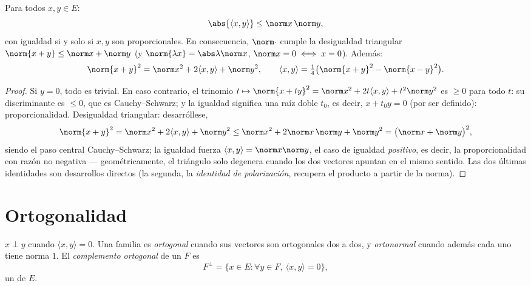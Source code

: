 \begin{theorem}\label{thm:b1:euclid:cs}
Para todos $x, y \in E$:
\[
\abs{\langle x, y\rangle} \leq \norm x\, \norm y ,
\]
con igualdad si y solo si $x, y$ son proporcionales. En consecuencia,
$\norm\cdot$ cumple la desigualdad triangular
$\norm{x + y} \leq \norm x + \norm y$ (y
$\norm{\lambda x} = \abs\lambda \norm x$, $\norm x = 0 \iff x = 0$).
Además:
\[
\norm{x+y}^2 = \norm x^2 + 2\langle x, y\rangle + \norm y^2,
\qquad
\langle x, y \rangle = \tfrac14\bigl(\norm{x+y}^2 -
\norm{x-y}^2\bigr) .
\]
\end{theorem}

\begin{proof}
Si $y = 0$, todo es trivial. En caso contrario, el trinomio
$t \mapsto \norm{x + ty}^2 = \norm x^2 + 2t\langle x, y\rangle + t^2
\norm y^2$ es $\geq 0$ para todo $t$: su discriminante es $\leq 0$,
que es Cauchy--Schwarz; y la igualdad significa una raíz doble $t_0$,
es decir, $x + t_0 y = 0$ (por ser definido): proporcionalidad.
Desigualdad triangular: desarróllese,
\[
\norm{x + y}^2 = \norm x^2 + 2\langle x, y\rangle + \norm y^2
\leq \norm x^2 + 2\norm x\,\norm y + \norm y^2
= \bigl(\norm x + \norm y\bigr)^2 ,
\]
siendo el paso central Cauchy--Schwarz; la igualdad fuerza
$\langle x, y\rangle = \norm x\norm y$, el caso de igualdad
\emph{positivo}, es decir, la proporcionalidad con razón no negativa
--- geométricamente, el triángulo solo degenera cuando los dos
vectores apuntan en el mismo sentido. Las dos últimas identidades son
desarrollos directos (la segunda, la \emph{identidad de
polarización}, recupera el producto a partir de la norma).
\end{proof}

\section{Ortogonalidad}

\begin{definition}\label{def:b1:euclid:orthogonal}
$x \perp y$ cuando $\langle x, y \rangle = 0$. Una familia es
\emph{ortogonal} cuando sus vectores son ortogonales dos a dos, y
\emph{ortonormal} cuando además cada uno
tiene norma $1$. El \emph{complemento ortogonal} de un 
$F$ es
\[
F^{\perp} = \{x \in E : \forall y \in F,\ \langle x, y\rangle =
0\},
\]
un  de $E$.
\end{definition}

